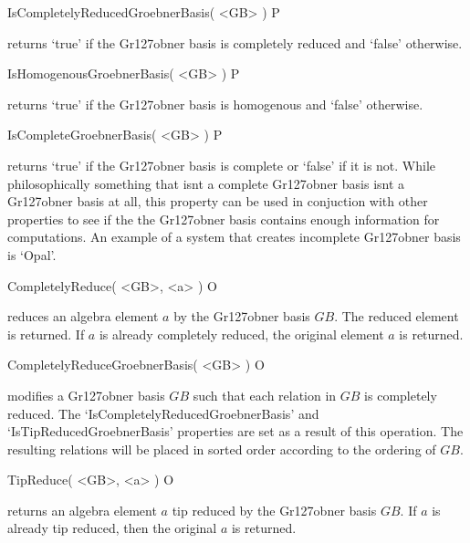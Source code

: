 \beginexample 
\endexample


\>IsCompletelyReducedGroebnerBasis( <GB> ) P

returns `true' if the Gr\accent127obner basis is completely reduced and 
`false' otherwise.

\beginexample 
\endexample


\>IsHomogenousGroebnerBasis( <GB> ) P

returns `true' if the Gr\accent127obner basis is homogenous and 
`false' otherwise.

\beginexample 
\endexample


\>IsCompleteGroebnerBasis( <GB> ) P

returns `true' if the Gr\accent127obner basis is complete or 
`false' if it is not. While philosophically something that 
isn\pif t a complete Gr\accent127obner basis isn\pif t a Gr\accent127obner basis at all, 
this property can be used in conjuction with other properties 
to see if the the Gr\accent127obner basis contains enough information 
for computations. An example of a system that creates incomplete 
Gr\accent127obner basis is `Opal'.

\beginexample 
\endexample



\>CompletelyReduce( <GB>, <a> ) O

reduces an algebra element $a$ by the Gr\accent127obner basis $GB$. 
The reduced element is returned. If $a$ is already completely 
reduced, the original element $a$ is returned.

\beginexample 
\endexample


\>CompletelyReduceGroebnerBasis( <GB> ) O

modifies a Gr\accent127obner basis $GB$ such that each relation in 
$GB$ is completely reduced.  The `IsCompletelyReducedGroebnerBasis' 
and `IsTipReducedGroebnerBasis' properties are set as a result of 
this operation. The resulting relations will be placed in sorted 
order according to the ordering of $GB$.

\beginexample 
\endexample


\>TipReduce( <GB>, <a> ) O

returns an algebra element $a$ tip reduced by the Gr\accent127obner 
basis $GB$. If $a$ is already tip reduced, then the original 
$a$ is returned.

\beginexample 
\endexample


